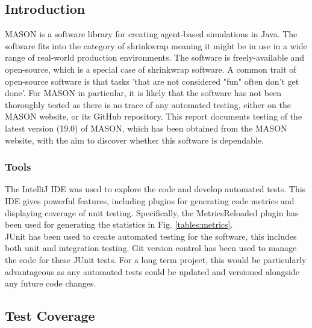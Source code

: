 \documentclass[11pt]{article}
\begin{document}
\subsection{Introduction}
MASON is a software library for creating agent-based simulations in Java. 
The software fits into the category of shrinkwrap meaning it might be in use in a wide range of real-world production environments. The software is freely-available and open-source, which is a special case of shrinkwrap software. A common trait of open-source software is that tasks 'that are not considered "fun" often don't get done'.\cite{five_worlds}
For MASON in particular, it is likely that the software has not been thoroughly tested as there is no trace of any automated testing, either on the MASON website, or its GitHub repository.
This report documents testing of the latest version (19.0) of MASON, which has been obtained from the MASON website, with the aim to discover whether this software is dependable.

\subsubsection{Tools}
The IntelliJ IDE was used to explore the code and develop automated tests.
This IDE gives powerful features, including plugins for generating code metrics and displaying coverage of unit testing.
Specifically, the MetricsReloaded plugin\cite{metrics_reloaded} has been used for generating the statistics in Fig. \ref{tables:metrics}.
\\

JUnit has been used to create automated testing for the software, this includes both unit and integration testing.
Git version control has been used to manage the code for these JUnit tests.
For a long term project, this would be particularly advantageous as any automated tests could be updated and versioned alongside any future code changes.

\subsection{Test Coverage}
\end{document}

